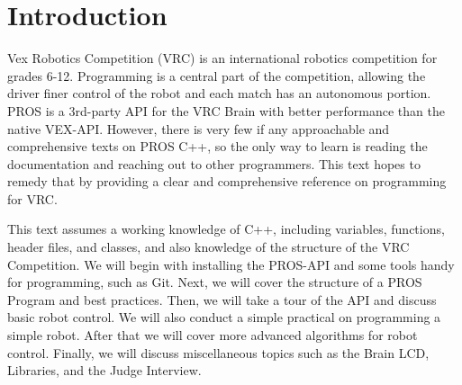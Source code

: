 \documentclass[main.tex]{subfiles}
\begin{document}
\chapter{Introduction}

Vex Robotics Competition (VRC) is an international robotics competition for grades 6-12.
Programming is a central part of the competition, allowing the driver finer control of the robot
    and each match has an autonomous portion.
PROS is a 3rd-party API for the VRC Brain with better performance than the native VEX-API.
However, there is very few if any approachable and comprehensive texts on PROS C++,
    so the only way to learn is reading the documentation and reaching out to other programmers.
This text hopes to remedy that by providing a clear and comprehensive reference on programming for VRC.

This text assumes a working knowledge of C++, including variables, functions, header files, and classes,
    and also knowledge of the structure of the VRC Competition.
We will begin with installing the PROS-API and some tools handy for programming, such as Git.
Next, we will cover the structure of a PROS Program and best practices.
Then, we will take a tour of the API and discuss basic robot control.
We will also conduct a simple practical on programming a simple robot.
After that we will cover more advanced algorithms for robot control.
Finally, we will discuss miscellaneous topics such as the Brain LCD, Libraries, and the Judge Interview.
\end{document}

